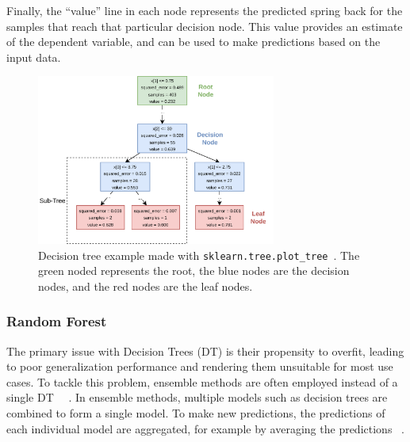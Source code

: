 Finally, the ``value'' line in each node represents the predicted spring back for the samples that reach that
particular decision node.
This value provides an estimate of the dependent variable, and can be used to make predictions based on the input data.

\begin{figure}[h]
    \begin{tcolorbox}[arc=0pt,boxrule=0.5pt]
        \centering
        \includegraphics[width=0.7\textwidth]{chap4/images/decision_tree_example}
    \end{tcolorbox}
    \caption{Decision tree example made with \texttt{sklearn.tree.plot\_tree}~\cite{scikit-learn}.
    The green noded represents the root, the blue nodes are the decision nodes, and the red nodes are the leaf nodes.}
    \label{fig:dt-example}
\end{figure}

\subsubsection{Random Forest}\label{subsubsec:random-forests}
The primary issue with Decision Trees (\ac{DT}) is their propensity to overfit, leading to poor generalization
performance and rendering them unsuitable for most use cases.
To tackle this problem, ensemble methods are often employed instead of a single
DT
~\cite[p. 83]{muller_introductionmachinelearning_2016}~\cite[p. 251]{liu_newmachinelearning_2012}.
In ensemble methods, multiple models such as decision trees are combined to form a single model.
To make new predictions, the predictions of each individual model are aggregated, for example by averaging the
predictions
~\cite[p. 222]{boehmke2019hands}.

